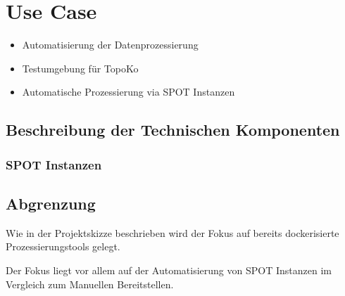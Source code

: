 \section{Use Case}
\begin{itemize}
\item Automatisierung der Datenprozessierung
\item Testumgebung für TopoKo
\item Automatische Prozessierung via SPOT Instanzen
\end{itemize}

\subsection{Beschreibung der Technischen Komponenten}
\subsubsection{SPOT Instanzen}


\subsection{Abgrenzung}
Wie in der Projektskizze beschrieben wird der Fokus auf bereits dockerisierte Prozessierungstools gelegt.

Der Fokus liegt vor allem auf der Automatisierung von SPOT Instanzen im Vergleich zum Manuellen Bereitstellen.